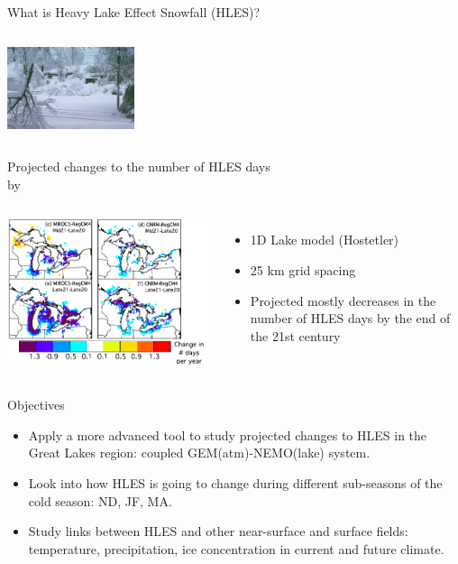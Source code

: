 \documentclass{beamer}
\begin{document}
\begin{frame}{What is Heavy Lake Effect Snowfall (HLES)?}
\begin{columns}
        \centering
        \includegraphics[height=6.5em,frame=0.05em]{hles_photo3}
    \end{columns}

  \end{frame}

  \begin{frame}{Projected changes to the number of HLES days\\ by~\citet{Notaro:2015}}
    \begin{columns}
        \includegraphics[height=0.6\textheight]{notaro_et_al_changes_to_hles_days.png}
        \begin{itemize}
          \item 1D Lake model (Hostetler)
          \item 25 km grid spacing
          \item Projected mostly decreases in the number of HLES days by the end of the 21st century
        \end{itemize}

    \end{columns}
  \end{frame}

  \begin{frame}{Objectives}
    \begin{itemize}
      \item Apply a more advanced tool to study projected changes to HLES in the Great Lakes region: coupled GEM(atm)-NEMO(lake) system.
      \item Look into how HLES is going to change during different sub-seasons of the cold season: ND, JF, MA.
      \item Study links between HLES and other near-surface and surface fields: temperature, precipitation, ice concentration in current and future climate.
    \end{itemize}
  \end{frame}
\end{document}
